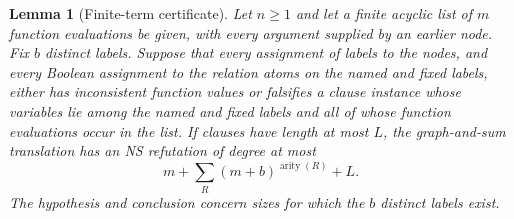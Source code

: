 \documentclass[11pt,a4paper,oneside,openany]{book}
\newtheorem{lemma}[theorem]{Lemma}
\theoremstyle{definition}\newtheorem{definition}[theorem]{Definition}
\theoremstyle{remark}\newtheorem{remark}[theorem]{Remark}
\numberwithin{equation}{chapter}
\begin{document}
\begin{lemma}[Finite-term certificate]\label{tx:lem:finite-certificate}
Let $n\ge1$ and let a finite acyclic list of $m$ function evaluations be given, with every
argument supplied by an earlier node. Fix $b$ distinct labels. Suppose that
every assignment of labels to the nodes, and every Boolean assignment to
the relation atoms on the named and fixed labels, either has inconsistent
function values or falsifies a clause instance whose variables lie among the named and fixed
labels and all of whose function evaluations occur in the list. If clauses have length at most $L$, the
graph-and-sum translation has an NS refutation of degree at most
\[
                 m+\sum_R(m+b)^{\operatorname{arity}(R)}+L.
\]
The hypothesis and conclusion concern sizes for which the $b$ distinct
labels exist.
\end{lemma}
\end{document}
